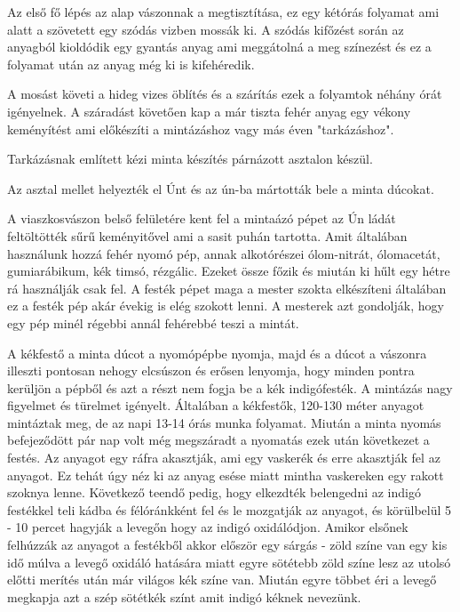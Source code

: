\documentclass[fontsize=12pt, appendixprefix=true]{scrreprt}
\begin{document}
Az első fő lépés az alap vászonnak a megtisztítása, ez egy kétórás folyamat ami alatt a szövetett egy szódás vizben mossák ki. A szódás kifőzést során az anyagból kioldódik egy gyantás anyag ami meggátolná a meg színezést és ez a folyamat után az anyag még ki is kifehéredik.

A mosást követi a hideg vizes öblítés és a szárítás ezek a folyamtok néhány órát igényelnek.
A száradást követően kap a már tiszta fehér anyag egy vékony keményítést ami előkészíti a mintázáshoz vagy más éven "tarkázáshoz".

Tarkázásnak említett kézi minta készítés párnázott asztalon készül.

Az asztal mellet helyezték el Únt és az ún-ba mártották bele a minta dúcokat.

A viaszkosvászon belső felületére kent fel a mintaázó pépet az Ún ládát feltöltötték sűrű keményitővel ami a sasit puhán tartotta. Amit általában használunk hozzá fehér nyomó pép, annak alkotórészei ólom-nitrát, ólomacetát, gumiarábikum, kék timsó, rézgálic. Ezeket össze főzik és miután ki hűlt egy hétre rá használják csak fel. A festék pépet maga a mester szokta elkészíteni általában ez a festék pép akár évekig is elég szokott lenni. A mesterek azt gondolják, hogy egy pép minél régebbi annál fehérebbé teszi a mintát.

A kékfestő a minta dúcot a nyomópépbe nyomja, majd és a dúcot a vászonra illeszti pontosan nehogy elcsúszon és erősen lenyomja, hogy minden pontra kerüljön a pépből és azt a részt nem fogja be a kék indigófesték. A mintázás nagy figyelmet és türelmet igényelt. Általában a kékfestők, 120-130 méter anyagot mintáztak meg, de az napi 13-14 órás munka folyamat. 
Miután a minta nyomás befejeződött pár nap volt még megszáradt a nyomatás ezek után következet a festés.
Az anyagot egy ráfra akasztják,  ami egy vaskerék és erre akasztják fel az anyagot. Ez tehát úgy néz ki az anyag esése  miatt mintha vaskereken egy rakott szoknya lenne.
Következő teendő pedig, hogy elkezdték belengedni  az indigó festékkel teli kádba és félóránkként fel és le mozgatják az anyagot, és körülbelül 5 - 10 percet hagyják a levegőn hogy az indigó oxidálódjon.
Amikor elsőnek felhúzzák az anyagot a festékből akkor először egy sárgás - zöld színe van egy kis idő  múlva a levegő oxidáló hatására miatt egyre sötétebb zöld színe lesz az utolsó előtti merítés után már világos kék színe van. Miután egyre többet éri a levegő megkapja azt a szép sötétkék színt amit indigó kéknek nevezünk. 
\end{document}
